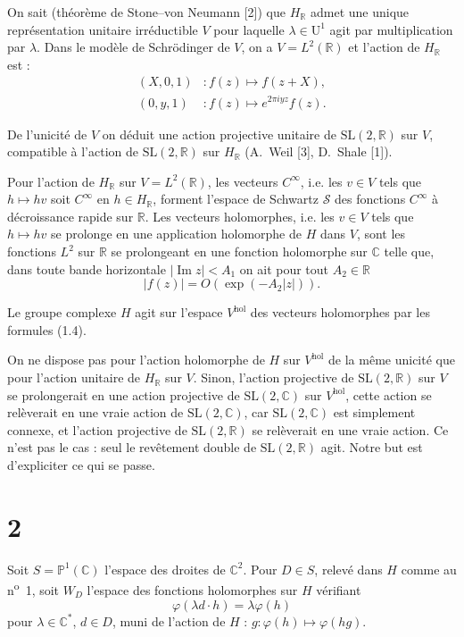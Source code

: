 \documentclass[12pt,a4paper]{article}
\theoremstyle{plain}
\theoremstyle{definition}
\theoremstyle{remark}
\DeclareMathOperator{\Impart}{Im}
\begin{document}
On sait (théorème de Stone--von Neumann [2]) que $H_\mathbb{R}$ admet une unique représentation unitaire irréductible $V$ pour laquelle $\lambda \in \mathrm{U}^1$ agit par multiplication par $\lambda$. Dans le modèle de Schrödinger de $V$, on a $V = L^2(\mathbb{R})$ et l'action de $H_\mathbb{R}$ est :
\begin{align*}
(X, 0, 1) &\colon f(z) \mapsto f(z + X), \\
(0, y, 1) &\colon f(z) \mapsto e^{2\pi iyz}f(z).\tag{1.4}
\end{align*}

De l'unicité de $V$ on déduit une action projective unitaire de $\mathrm{SL}(2, \mathbb{R})$ sur $V$, compatible à l'action de $\mathrm{SL}(2, \mathbb{R})$ sur $H_\mathbb{R}$ (A.~Weil [3], D.~Shale [1]).

Pour l'action de $H_\mathbb{R}$ sur $V = L^2(\mathbb{R})$, les vecteurs $C^\infty$, i.e. les $v \in V$ tels que $h \mapsto hv$ soit $C^\infty$ en $h \in H_\mathbb{R}$, forment l'espace de Schwartz $\mathcal{S}$ des fonctions $C^\infty$ à décroissance rapide sur $\mathbb{R}$. Les vecteurs holomorphes, i.e. les $v \in V$ tels que $h \mapsto hv$ se prolonge en une application holomorphe de $H$ dans $V$, sont les fonctions $L^2$ sur $\mathbb{R}$ se prolongeant en une fonction holomorphe sur $\mathbb{C}$ telle que, dans toute bande horizontale $|\Impart z| < A_1$ on ait pour tout $A_2 \in \mathbb{R}$
\[|f(z)| = O(\exp(-A_2|z|)).\]

Le groupe complexe $H$ agit sur l'espace $V^{\mathrm{hol}}$ des vecteurs holomorphes par les formules (1.4).

On ne dispose pas pour l'action holomorphe de $H$ sur $V^{\mathrm{hol}}$ de la même unicité que pour l'action unitaire de $H_\mathbb{R}$ sur $V$. Sinon, l'action projective de $\mathrm{SL}(2, \mathbb{R})$ sur $V$ se prolongerait en une action projective de $\mathrm{SL}(2, \mathbb{C})$ sur $V^{\mathrm{hol}}$, cette action se relèverait en une vraie action de $\mathrm{SL}(2, \mathbb{C})$, car $\mathrm{SL}(2, \mathbb{C})$ est simplement connexe, et l'action projective de $\mathrm{SL}(2, \mathbb{R})$ se relèverait en une vraie action. Ce n'est pas le cas : seul le revêtement double de $\mathrm{SL}(2, \mathbb{R})$ agit. Notre but est d'expliciter ce qui se passe.

\section*{2}

Soit $S = \mathbb{P}^1(\mathbb{C})$ l'espace des droites de $\mathbb{C}^2$. Pour $D \in S$, relevé dans $H$ comme au n\textsuperscript{o}~1, soit $W_D$ l'espace des fonctions holomorphes sur $H$ vérifiant
\[\varphi(\lambda d \cdot h) = \lambda\varphi(h)\]
pour $\lambda \in \mathbb{C}^*$, $d \in D$, muni de l'action de $H$ : $g \colon \varphi(h) \mapsto \varphi(hg)$.
\end{document}
